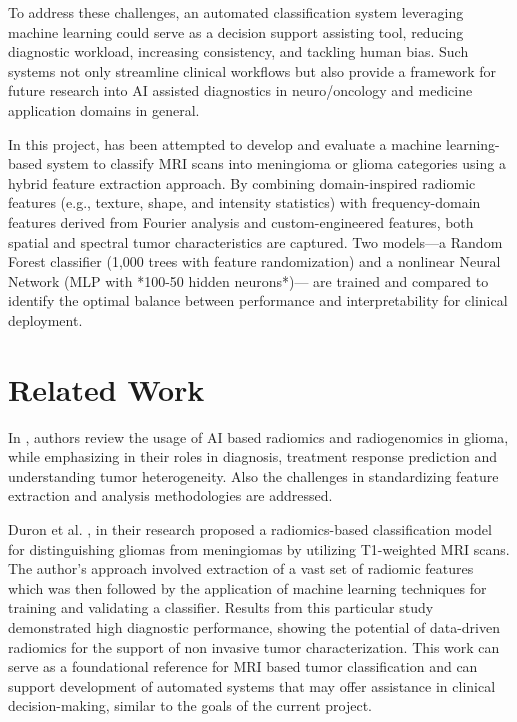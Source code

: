 \documentclass[11pt,a4paper]{article}
\begin{document}
To address these challenges, an automated classification system leveraging machine learning could serve as a decision support assisting tool, 
reducing diagnostic workload, increasing consistency, and tackling human bias. 
Such systems not only streamline clinical workflows
but also provide a framework for future research into AI assisted diagnostics 
in neuro/oncology and medicine application domains in general.

In this project, has been attempted to develop and evaluate a machine learning-based system
to classify MRI scans into meningioma or glioma categories
using a hybrid feature extraction approach. 
By combining domain-inspired radiomic features 
(e.g., texture, shape, and intensity statistics)
with frequency-domain features derived from Fourier analysis and custom-engineered features, 
both spatial and spectral tumor characteristics are captured.
Two models—a Random Forest classifier (1,000 trees with feature randomization) and a nonlinear Neural Network (MLP with *100-50 hidden neurons*)—
are trained and compared to identify the optimal balance between performance and interpretability for clinical deployment.


\section{Related Work}

	In \cite{Fan}, authors review the usage of AI based radiomics and radiogenomics in glioma, 
	while emphasizing in their roles in diagnosis, treatment response prediction and understanding tumor heterogeneity. 
	Also the challenges in standardizing feature extraction and analysis methodologies are addressed.


	Duron et al. \cite{duron}, in their research
	proposed a radiomics-based classification model for distinguishing 
	gliomas from meningiomas by utilizing T1-weighted MRI scans. 
	The author's approach involved extraction of a vast set of radiomic features 
	which was then followed by the application of machine learning techniques for training and validating a classifier. 
	Results from this particular study demonstrated high diagnostic performance, 
	showing the potential of  data-driven radiomics for the support of
	non invasive tumor characterization. 
	This work can serve as a foundational reference for 
	MRI based tumor classification and 
	can support development of automated systems that may offer assistance
	in clinical decision-making, similar to the goals of the current project.
	
\end{document}
